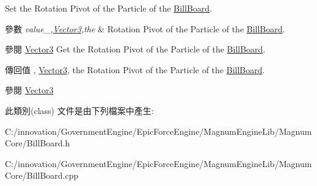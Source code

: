 Set the Rotation Pivot of the Particle of the \hyperlink{class_i_dream_sky_1_1_bill_board}{Bill\+Board}. 


\begin{DoxyParams}{參數}
{\em value\+\_\+,\hyperlink{class_i_dream_sky_1_1_vector3}{Vector3},the} & Rotation Pivot of the Particle of the \hyperlink{class_i_dream_sky_1_1_bill_board}{Bill\+Board}. \\
\hline
\end{DoxyParams}
\begin{DoxySeeAlso}{參閱}
\hyperlink{class_i_dream_sky_1_1_vector3}{Vector3} Get the Rotation Pivot of the Particle of the \hyperlink{class_i_dream_sky_1_1_bill_board}{Bill\+Board}. 
\end{DoxySeeAlso}
\begin{DoxyReturn}{傳回值}
, \hyperlink{class_i_dream_sky_1_1_vector3}{Vector3}, the Rotation Pivot of the Particle of the \hyperlink{class_i_dream_sky_1_1_bill_board}{Bill\+Board}. 
\end{DoxyReturn}
\begin{DoxySeeAlso}{參閱}
\hyperlink{class_i_dream_sky_1_1_vector3}{Vector3} 
\end{DoxySeeAlso}


此類別(class) 文件是由下列檔案中產生\+:\begin{DoxyCompactItemize}
\item 
C\+:/innovation/\+Government\+Engine/\+Epic\+Force\+Engine/\+Magnum\+Engine\+Lib/\+Magnum\+Core/Bill\+Board.\+h\item 
C\+:/innovation/\+Government\+Engine/\+Epic\+Force\+Engine/\+Magnum\+Engine\+Lib/\+Magnum\+Core/Bill\+Board.\+cpp\end{DoxyCompactItemize}
